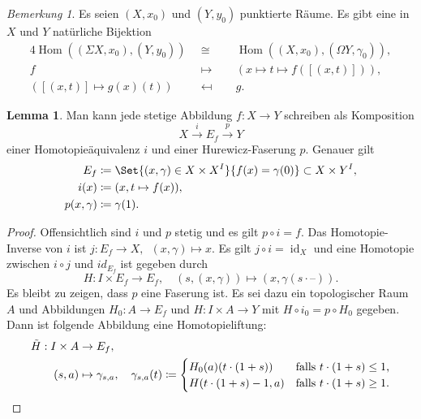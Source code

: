 \documentclass[11pt, a4paper, german]{article}
\theoremstyle{definition}
\newtheorem{lem}{Lemma}
\theoremstyle{remark}
\newtheorem*{bem}{Bemerkung}
\DeclareMathOperator{\Hom}{Hom} %
\DeclareMathOperator{\id}{id} %
\newcommand{\blank}{\text{--}} %
\newcommand{\I}{I} %
\begin{document}

\begin{bem}
  Es seien $(X, x_0)$ und $(Y, y_0)$ punktierte Räume.
  Es gibt eine in $X$ und $Y$ natürliche Bijektion
  \begin{alignat*}{4}
    \Hom((\Sigma X, x_0), (Y, y_0)) & \enspace\cong\enspace && \Hom((X, x_0), (\Omega Y, \gamma_0)), \\
    f & \enspace\mapsto\enspace && (x \mapsto t \mapsto f([(x, t)])), \\
    ([(x, t)] \mapsto g(x)(t)) & \enspace\mapsfrom\enspace && g.
  \end{alignat*}
\end{bem}

\begin{lem}\label{convert-to-fibration}
  Man kann jede stetige Abbildung $f : X \to Y$ schreiben als Komposition
  \[ X \xrightarrow{i} E_f \xrightarrow{p} Y \]
  einer Homotopieäquivalenz $i$ und einer Hurewicz-Faserung $p$.
  Genauer gilt
  \begin{align*}
    E_f & \coloneqq \Set{(x, \gamma) \in X \times X^\I}{f(x) = \gamma(0)} \subset X \times Y^\I, \\
    i(x) & \coloneqq (x, t \mapsto f(x)), \\
    p(x, \gamma) & \coloneqq \gamma(1).
  \end{align*}
\end{lem}

\begin{proof}
  Offensichtlich sind $i$ und $p$ stetig und es gilt $p \circ i = f$.
  Das Homotopie-Inverse von $i$ ist $j : E_f \to X, \enspace (x, \gamma) \mapsto x$.
  Es gilt $j \circ i = \id_X$ und eine Homotopie zwischen $i \circ j$ und $id_{E_f}$ ist gegeben durch
  \[
    H : \I \times E_f \to E_f, \quad
    (s, (x, \gamma)) \mapsto (x, \gamma(s \cdot \blank)).
  \]
  Es bleibt zu zeigen, dass $p$ eine Faserung ist.
  Es sei dazu ein topologischer Raum $A$ und Abbildungen $H_0 : A \to E_f$ und $H : \I \times A \to Y$ mit $H \circ i_0 = p \circ H_0$ gegeben.
  Dann ist folgende Abbildung eine Homotopieliftung:
  \begin{align*}
    \tilde{H} : \I \times A & \to E_f, \\
    (s, a) & \mapsto \gamma_{s, a}, \quad
    \gamma_{s, a}(t) \coloneqq \begin{cases}
      H_0(a)(t \cdot (1+s)) & \text{falls $t \cdot (1+s) \leq 1$,} \\
      H(t \cdot (1+s) - 1, a) & \text{falls $t \cdot (1+s) \geq 1$.}
      \qedhere
    \end{cases}
  \end{align*}
\end{proof}
\end{document}
